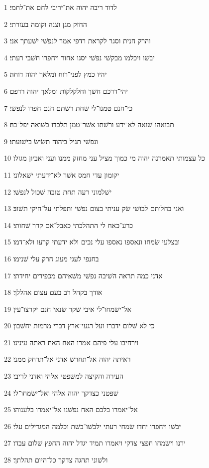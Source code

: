 \par 1 לדוד ריבה יהוה את־יריבי לחם את־לחמי׃
\par 2 החזק מגן וצנה וקומה בעזרתי׃
\par 3 והרק חנית וסגר לקראת רדפי אמר לנפשׁי ישׁעתך אני׃
\par 4 יבשׁו ויכלמו מבקשׁי נפשׁי יסגו אחור ויחפרו חשׁבי רעתי׃
\par 5 יהיו כמץ לפני־רוח ומלאך יהוה דוחה׃
\par 6 יהי־דרכם חשׁך וחלקלקות ומלאך יהוה רדפם׃
\par 7 כי־חנם טמנו־לי שׁחת רשׁתם חנם חפרו לנפשׁי׃
\par 8 תבואהו שׁואה לא־ידע ורשׁתו אשׁר־טמן תלכדו בשׁואה יפל־בה׃
\par 9 ונפשׁי תגיל ביהוה תשׂישׂ בישׁועתו׃
\par 10 כל עצמותי תאמרנה יהוה מי כמוך מציל עני מחזק ממנו ועני ואביון מגזלו׃
\par 11 יקומון עדי חמס אשׁר לא־ידעתי ישׁאלוני׃
\par 12 ישׁלמוני רעה תחת טובה שׁכול לנפשׁי׃
\par 13 ואני בחלותם לבושׁי שׂק עניתי בצום נפשׁי ותפלתי על־חיקי תשׁוב׃
\par 14 כרע־כאח לי התהלכתי כאבל־אם קדר שׁחותי׃
\par 15 ובצלעי שׂמחו ונאספו נאספו עלי נכים ולא ידעתי קרעו ולא־דמו׃
\par 16 בחנפי לעגי מעוג חרק עלי שׁנימו׃
\par 17 אדני כמה תראה השׁיבה נפשׁי משׁאיהם מכפירים יחידתי׃
\par 18 אודך בקהל רב בעם עצום אהללך׃
\par 19 אל־ישׂמחו־לי איבי שׁקר שׂנאי חנם יקרצו־עין׃
\par 20 כי לא שׁלום ידברו ועל רגעי־ארץ דברי מרמות יחשׁבון׃
\par 21 וירחיבו עלי פיהם אמרו האח האח ראתה עינינו׃
\par 22 ראיתה יהוה אל־תחרשׁ אדני אל־תרחק ממני׃
\par 23 העירה והקיצה למשׁפטי אלהי ואדני לריבי׃
\par 24 שׁפטני כצדקך יהוה אלהי ואל־ישׂמחו־לי׃
\par 25 אל־יאמרו בלבם האח נפשׁנו אל־יאמרו בלענוהו׃
\par 26 יבשׁו ויחפרו יחדו שׂמחי רעתי ילבשׁו־בשׁת וכלמה המגדילים עלי׃
\par 27 ירנו וישׂמחו חפצי צדקי ויאמרו תמיד יגדל יהוה החפץ שׁלום עבדו׃
\par 28 ולשׁוני תהגה צדקך כל־היום תהלתך׃

